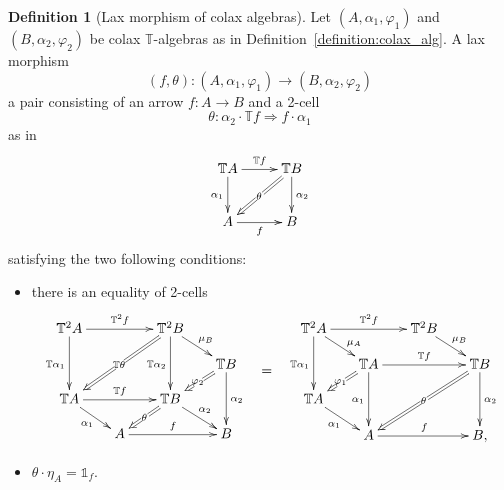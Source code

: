 \documentclass[12pt,leqno]{amsart}
\theoremstyle{definition}
\newtheorem{definition}[theorem]{Definition}
\def\T{\mathbb{T}}
\def\id{{\mathbb 1}}
\newcommand{\4}{\texttt{4}}
\renewcommand{\phi}{\varphi}
\begin{document}
\begin{definition}[Lax morphism of colax algebras]
\label{definition:lax_morph_of_colax_alg}
Let $(A,\alpha_1,\phi_1)$ and $(B,\alpha_2,\phi_2)$ be 
colax $\T$-al\-gebras as in Definition~\ref{definition:colax_alg}. 
A lax morphism 
\[
(f,\theta)\colon (A,\alpha_1,\phi_1)\to (B,\alpha_2,\phi_2)
\]
a pair consisting of an arrow 
$f\colon A\to B$ and a 2-cell 
\[
\theta\colon \alpha_2\cdot \T f  \Rightarrow f\cdot \alpha_1
\]
as in
\begin{equation}
\xymatrix@R=2.5em@C=2.5em{
\T A \ar[r]^{\T f} \ar[d]_{\alpha_1} 
& \T B\ar[d]^{\alpha_2} \ar@{=>}[dl]|{\theta\rule{.1em}{0pt}}
\\
A \ar[r]_{f} & B
}
\end{equation}satisfying the two following conditions:
\begin{itemize}[topsep=0pt, partopsep=0pt, itemsep=0pt, itemindent=-1em]
\item[(i)]
there is an equality of 2-cells
\[
\xymatrix@R=1.2em@C=1.7em{
\T^2 A \ar[rr]^{\T^2 f}\ar[dd]_{\T \alpha_1} && \T^2 B \ar@{=>}[lldd]|{\T\theta\rule{.1em}{0pt}}\ar[rd]^{\mu_B} \ar[dd]_{\T \alpha_2}
\\
&&& \T B \ar[dd]^{\alpha_2} \ar@{=>}[ld]|{\phi_2\rule{.1em}{0pt}}
\\
\T A  \ar[rr]^{\T f} \ar[rd]_{\alpha_1} && \T B
\ar@{=>}[ld]|{\theta\rule{.1em}{0pt}}
\ar[dr]^{\alpha_2}
\\
&A \ar[rr]^f && B
}
\hskip 1em
\raisebox{-3em}{$=$} \hskip 1em
\xymatrix@R=1.2em@C=1.7em{
\T^2 A \ar[rr]^{\T^2 f}\ar[dd]_{{\T \alpha_1}} \ar[rd]^(.6){\mu_A}   && 
\T^2 B \ar[rd]^{\mu_B} 
\\
&\T A \ar@{=>}[ld]|{\phi_1\rule{.1em}{0pt}} \ar[rr]^{\T f}   \ar[dd]_{\alpha_1}&& \T B \ar[dd]^{\alpha_2} 
\ar@{=>}[lldd]|{\theta\rule{.1em}{0pt}}
\\
\T A \ar[rd]_{\alpha_1} &&
\\
&A \ar[rr]^f && B,
}
\]
\item[(ii)] $\theta\cdot\eta_A=\id_f$.
\end{itemize} 
\end{definition}
\end{document}
